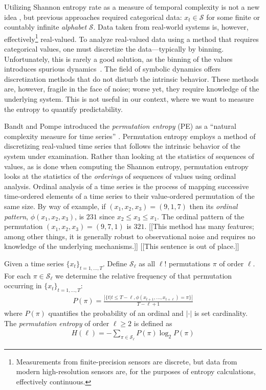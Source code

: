 Utilizing Shannon entropy rate as a measure of temporal complexity is
not a new idea \cite{Shannon1951, mantegna1994linguistic}, but
previous approaches required categorical data: $x_t \in \mathcal{S}$
for some finite or countably infinite \emph{alphabet} $\mathcal{S}$.
Data taken from real-world systems is, however,
effectively\footnote{Measurements from finite-precision sensors are
  discrete, but data from modern high-resolution sensors are, for the
  purposes of entropy calculations, effectively continuous.}
real-valued.  To analyze real-valued data using a method that requires
categorical values, one must discretize the data---typically by
binning.  Unfortunately, this is rarely a good solution, as the
binning of the values introduces spurious dynamics~\cite{bollt2001}.
The field of symbolic dynamics offers discretization methods that do
not disturb the intrinsic behavior.  These methods are, however,
fragile in the face of noise; worse yet, they require knowledge of the
underlying system.  This is not useful in our context, where we want
to measure the entropy to quantify predictability.

Bandt and Pompe introduced the \emph{permutation entropy} (PE) as a
``natural complexity measure for time series''
\cite{bandt2002per}. Permutation entropy employs a method of
discretizing real-valued time series that follows the intrinsic
behavior of the system under examination.  Rather than looking at the
statistics of sequences of values, as is done when computing the
Shannon entropy, permutation entropy looks at the statistics of the
\emph{orderings} of sequences of values using ordinal
analysis. Ordinal analysis of a time series is the process of mapping
successive time-ordered elements of a time series to their
value-ordered permutation of the same size.  By way of example, if
$(x_1, x_2, x_3) = (9, 1, 7)$ then its \emph{ordinal pattern},
$\phi(x_1, x_2, x_3)$, is $231$ since $x_2 \leq x_3 \leq x_1$.  The
ordinal pattern of the permutation $(x_1, x_2, x_3) = (9, 7, 1)$ is
$321$.  {\color{red} [[This method has many features; among other
      things, it is generally robust to observational noise and
      requires no knowledge of the underlying mechanisms.]] [[This
      sentence is out of place.]]}

\begin{mydef}

  Given a time series $\{x_t\}_{t = 1,\dots,T}$. Define $\mathcal{S}_\ell$ as all $\ell!$ permutations $\pi$ of order $\ell$. For each $\pi \in \mathcal{S}_\ell$ we determine the relative frequency of that permutation occurring in $\{x_t\}_{t = 1,\dots,T}$:
  \begin{align*}
    P(\pi) = \frac{\left|\{t|t \leq T-\ell,\phi(x_{t+1},\dots,x_{t+\ell}) = \pi\}\right|}{T-\ell+1}
  \end{align*}
  where $P(\pi)$ quantifies the probability of an ordinal and
  $|\cdot|$ is set cardinality. The \emph{permutation entropy} of
  order $\ell \ge 2$ is defined as
  \begin{align*}
    H(\ell) = - \sum_{\pi \in \mathcal{S}_\ell} P(\pi) \log_2 P(\pi)
  \end{align*}

\end{mydef}

